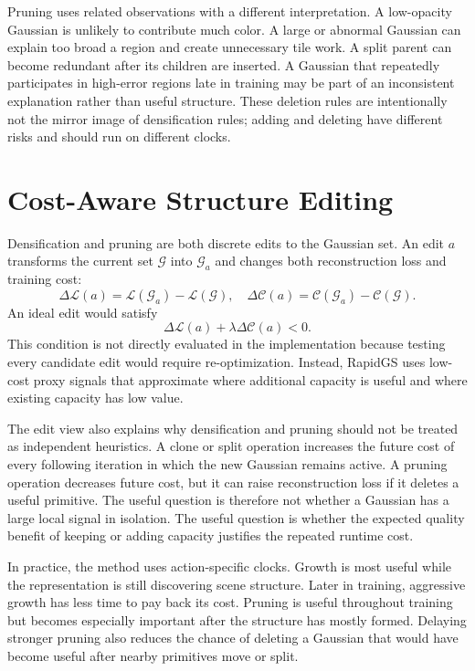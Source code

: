 Pruning uses related observations with a different interpretation. A low-opacity Gaussian is unlikely to contribute much color. A large or abnormal Gaussian can explain too broad a region and create unnecessary tile work. A split parent can become redundant after its children are inserted. A Gaussian that repeatedly participates in high-error regions late in training may be part of an inconsistent explanation rather than useful structure. These deletion rules are intentionally not the mirror image of densification rules; adding and deleting have different risks and should run on different clocks.

\section{Cost-Aware Structure Editing}

Densification and pruning are both discrete edits to the Gaussian set. An edit $a$ transforms the current set $\mathcal{G}$ into $\mathcal{G}_a$ and changes both reconstruction loss and training cost:
\begin{equation}
\Delta\mathcal{L}(a)
=
\mathcal{L}(\mathcal{G}_a)-\mathcal{L}(\mathcal{G}),
\quad
\Delta\mathcal{C}(a)
=
\mathcal{C}(\mathcal{G}_a)-\mathcal{C}(\mathcal{G}).
\end{equation}
An ideal edit would satisfy
\begin{equation}
\Delta\mathcal{L}(a)+\lambda\Delta\mathcal{C}(a)<0.
\end{equation}
This condition is not directly evaluated in the implementation because testing every candidate edit would require re-optimization. Instead, RapidGS uses low-cost proxy signals that approximate where additional capacity is useful and where existing capacity has low value.

The edit view also explains why densification and pruning should not be treated as independent heuristics. A clone or split operation increases the future cost of every following iteration in which the new Gaussian remains active. A pruning operation decreases future cost, but it can raise reconstruction loss if it deletes a useful primitive. The useful question is therefore not whether a Gaussian has a large local signal in isolation. The useful question is whether the expected quality benefit of keeping or adding capacity justifies the repeated runtime cost.

In practice, the method uses action-specific clocks. Growth is most useful while the representation is still discovering scene structure. Later in training, aggressive growth has less time to pay back its cost. Pruning is useful throughout training but becomes especially important after the structure has mostly formed. Delaying stronger pruning also reduces the chance of deleting a Gaussian that would have become useful after nearby primitives move or split.

